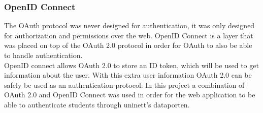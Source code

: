 \subsubsection{OpenID Connect}
The OAuth protocol was never designed for authentication, it was only designed for authorization and permissions over the web. OpenID Connect\cite{openidconnect} is a layer that was placed on top of the OAuth 2.0 protocol in order for OAuth to also be able to handle authentication.
\\[11pt]
OpenID connect allows OAuth 2.0 to store an ID token, which  will be used to get information about the user. With this extra user information OAuth 2.0 can be safely be used as an authentication protocol. In this project a combination of OAuth 2.0 and OpenID Connect was used in order for the web application to be able to authenticate students through uninett's dataporten\cite{dataporten}.